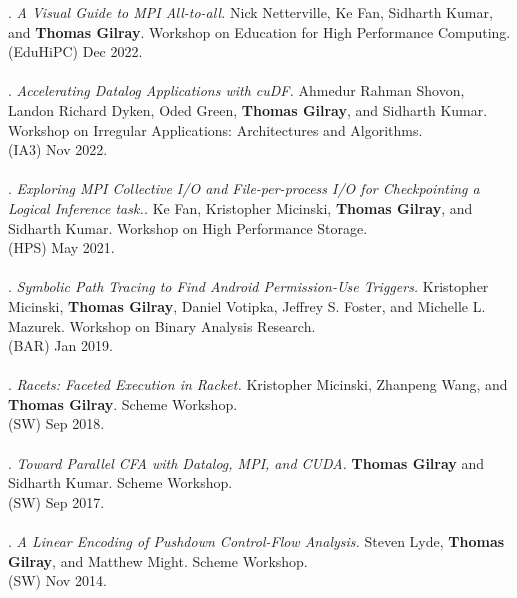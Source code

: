 \paper. \textit{A Visual Guide to MPI All-to-all.}
Nick Netterville, Ke Fan, Sidharth Kumar, and \textbf{Thomas Gilray}.
Workshop on Education for High Performance Computing.
\\(EduHiPC) Dec 2022. 
\\ \vspace{-0.1cm}\\
\paper. \textit{Accelerating Datalog Applications with cuDF.}
Ahmedur Rahman Shovon, Landon Richard Dyken, Oded Green, \textbf{Thomas Gilray}, and Sidharth Kumar.
Workshop on Irregular Applications: Architectures and Algorithms.
\\(IA3) Nov 2022. 
\\ \vspace{-0.1cm}\\
\paper. \textit{Exploring MPI Collective I/O and File-per-process I/O for Checkpointing a Logical Inference task..}
Ke Fan, Kristopher Micinski, \textbf{Thomas Gilray}, and Sidharth Kumar.
Workshop on High Performance Storage.
\\(HPS) May 2021. 
\\ \vspace{-0.1cm}\\
\paper. \textit{Symbolic Path Tracing to Find Android Permission-Use Triggers.}
Kristopher Micinski, \textbf{Thomas Gilray}, Daniel Votipka, Jeffrey S. Foster, and Michelle L. Mazurek.
Workshop on Binary Analysis Research.
\\(BAR) Jan 2019. 
\\ \vspace{-0.1cm}\\
\paper. \textit{Racets: Faceted Execution in Racket.}
Kristopher Micinski, Zhanpeng Wang, and \textbf{Thomas Gilray}.
Scheme Workshop.
\\(SW) Sep 2018. 
\\ \vspace{-0.1cm}\\
\paper. \textit{Toward Parallel CFA with Datalog, MPI, and CUDA.}
\textbf{Thomas Gilray} and Sidharth Kumar.
Scheme Workshop.
\\(SW) Sep 2017. 
\\ \vspace{-0.1cm}\\
\paper. \textit{A Linear Encoding of Pushdown Control-Flow Analysis.}
Steven Lyde, \textbf{Thomas Gilray}, and Matthew Might.
Scheme Workshop.
\\(SW) Nov 2014. 
\\ \vspace{-0.1cm}\\
